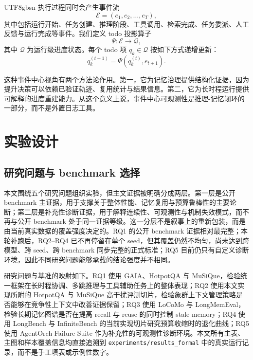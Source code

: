 \documentclass[a4paper,fleqn]{cas-sc}
\begin{document}
\begin{CJK*}{UTF8}{gbsn}
执行过程同时会产生事件流
\begin{equation}
\mathcal{E} = (e_1, e_2, \ldots, e_T),
\end{equation}
其中包括运行开始、任务创建、推理阶段、工具调用、检索完成、任务委派、人工反馈与运行完成等事件。我们定义 todo 投影算子
\begin{equation}
\Psi : \mathcal{E} \rightarrow \mathcal{Q},
\end{equation}
其中 $\mathcal{Q}$ 为运行级进度状态。每个 todo 项 $q_k \in \mathcal{Q}$ 按如下方式递增更新：
\begin{equation}
q_k^{(t+1)} = \Psi(q_k^{(t)}, e_{t+1}).
\end{equation}

这种事件中心视角有两个方法论作用。第一，它为记忆治理提供结构化证据，因为提升决策可以依赖已验证轨迹、复用统计与结果信息。第二，它为长时程运行提供可解释的进度重建能力。从这个意义上说，事件中心可观测性是推理-记忆闭环的一部分，而不是外置日志工具。

\section{实验设计}

\subsection{研究问题与 benchmark 选择}

本文围绕五个研究问题组织实验，但主文证据被明确分成两层。第一层是公开 benchmark 主证据，用于支撑关于整体性能、记忆复用与预算鲁棒性的主要论断；第二层是补充性诊断证据，用于解释连续性、可观测性与机制失效模式，而不再与公开 benchmark 处于同一证据等级。这一分层不是叙事上的重新包装，而是由当前真实数据的覆盖强度决定的。RQ1 的公开 benchmark 证据相对最完整；本轮补跑后，RQ2--RQ4 已不再停留在单个 seed，但其覆盖仍然不均匀，尚未达到跨模型、跨 seed、跨 benchmark 同步完整的正式标准；RQ5 目前仍只有自定义诊断环境，因此不同研究问题能够承载的结论强度并不相同。

研究问题与基准的映射如下。RQ1 使用 GAIA、HotpotQA 与 MuSiQue，检验统一框架在长时程协调、多跳推理与工具辅助任务上的整体表现；RQ2 使用本文实现所附的 HotpotQA 与 MuSiQue 高干扰评测切片，检验象群上下文管理策略是否能够在竞争性上下文中改善证据保留；RQ3 使用 LoCoMo 与 LongMemEval，检验长期记忆图谱是否在提高 recall 与 reuse 的同时控制 stale memory；RQ4 使用 LongBench 与 InfiniteBench 的当前实现切片研究预算收缩时的退化曲线；RQ5 使用 AgentOrch Failure Suite 作为补充性的可观测性诊断环境。本文所有主表、主图和样本覆盖信息均直接追溯到 \texttt{experiments/results\_formal} 中的真实运行记录，而不是手工填表或示例性数字。


\end{CJK*}
\end{document}
